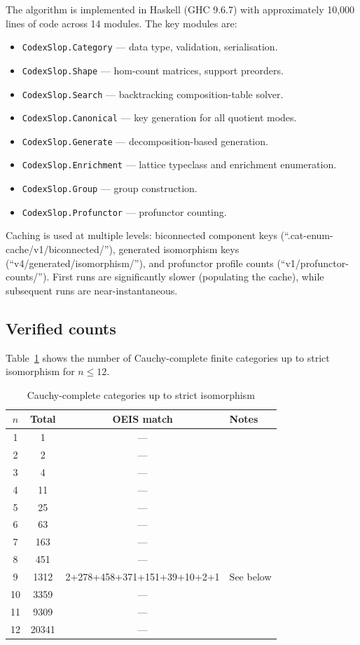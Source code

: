\documentclass[12pt,a4paper]{amsart}
\theoremstyle{definition}
\theoremstyle{remark}
\begin{document}
The algorithm is implemented in Haskell (GHC 9.6.7) with approximately
10,000 lines of code across 14 modules.  The key modules are:

\begin{itemize}
\item \texttt{CodexSlop.Category} --- data type, validation, serialisation.
\item \texttt{CodexSlop.Shape} --- hom-count matrices, support preorders.
\item \texttt{CodexSlop.Search} --- backtracking composition-table solver.
\item \texttt{CodexSlop.Canonical} --- key generation for all quotient modes.
\item \texttt{CodexSlop.Generate} --- decomposition-based generation.
\item \texttt{CodexSlop.Enrichment} --- lattice typeclass and enrichment
  enumeration.
\item \texttt{CodexSlop.Group} --- group construction.
\item \texttt{CodexSlop.Profunctor} --- profunctor counting.
\end{itemize}

Caching is used at multiple levels: biconnected component keys
(``.cat-enum-cache/v1/biconnected/''), generated isomorphism keys
(``v4/generated/isomorphism/''), and profunctor profile counts
(``v1/profunctor-counts/'').  First runs are significantly slower
(populating the cache), while subsequent runs are near-instantaneous.

\subsection{Verified counts}
\label{sec:results}

Table~\ref{tab:counts} shows the number of Cauchy-complete finite
categories up to strict isomorphism for $n \leq 12$.

\begin{table}[h]
\centering
\begin{tabular}{c|c|c|l}
$n$ & Total & OEIS match & Notes \\
\hline
1 & 1 & --- & \\
2 & 2 & --- & \\
3 & 4 & --- & \\
4 & 11 & --- & \\
5 & 25 & --- & \\
6 & 63 & --- & \\
7 & 163 & --- & \\
8 & 451 & --- & \\
9 & 1312 & 2+278+458+371+151+39+10+2+1 & See below \\
10 & 3359 & --- & \\
11 & 9309 & --- & \\
12 & 20341 & --- &
\end{tabular}
\caption{Cauchy-complete categories up to strict isomorphism}
\label{tab:counts}
\end{table}
\end{document}
